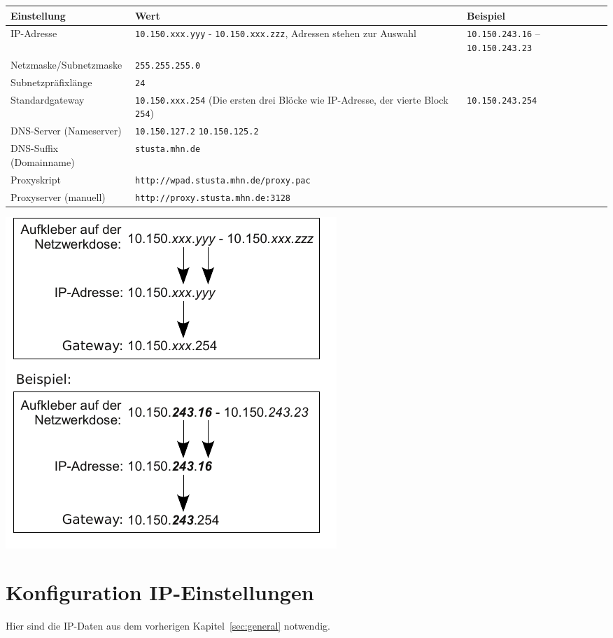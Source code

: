 \documentclass[a4paper,12pt]{scrartcl}
\begin{document}
\begin{minipage}{\textwidth}
\begin{center}
  \begin{tabularx}{\linewidth}{lXp{.2\linewidth}}
    \textbf{Einstellung} & \textbf{Wert} & \textbf{Beispiel} \\
    \midrule
    IP-Adresse & \nolinkurl{10.150.xxx.yyy} - \nolinkurl{10.150.xxx.zzz}, \newline 8 Adressen stehen zur Auswahl & \nolinkurl{10.150.243.16} – \nolinkurl{10.150.243.23} \\
    \hline
    Netzmaske/Subnetzmaske & \nolinkurl{255.255.255.0} & \\
    \hline
    Subnetzpräfixlänge & \nolinkurl{24} & \\
    \hline
    Standardgateway & \nolinkurl{10.150.xxx.254} \newline (Die ersten drei Blöcke wie IP-Adresse, der vierte Block \nolinkurl{254}) & \nolinkurl{10.150.243.254} \\
    \hline
    DNS-Server (Nameserver) & \nolinkurl{10.150.127.2} \newline \nolinkurl{10.150.125.2} & \\
    \hline
    DNS-Suffix (Domainname) & \nolinkurl{stusta.mhn.de} & \\
    \hline
    Proxyskript &{\nolinkurl{http://wpad.stusta.mhn.de/proxy.pac}} & \\ 
    \hline
    Proxyserver (manuell) & {\nolinkurl{http://proxy.stusta.mhn.de:3128}} & \\ 
    \bottomrule
  \end{tabularx}
\includegraphics[width=0.4\linewidth,keepaspectratio]{Bilder/IP_Gerneric}
\end{center}
\end{minipage}

\newpage

\section{Konfiguration IP-Einstellungen}
\label{section_netzweradresse}
Hier sind die IP-Daten aus dem vorherigen Kapitel~\ref{sec:general} notwendig.
\end{document}
